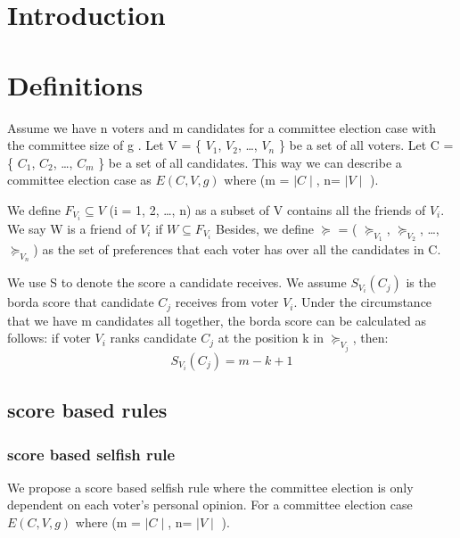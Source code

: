 \documentclass[
   a4paper,                      %
   tucfont,                      %
   english,                      %
   tuctitle,                     %
   intoc,                        %
   twoside,                      %
   captions=tableheading,        %
   openright,                    %
   final,                        %
   ]{tuc-thesis}                 %
\begin{document}
\frontmatter

\makeTUCtitle                   %

\section{Introduction}


\section{Definitions}
Assume we have n voters and m candidates for a committee election case with the committee size of g . Let V = \{ $V_1$, $V_2$, \dots , $V_n$ \} be a set of all voters. Let C = \{ $C_1$, $C_2$, \dots , $C_m$ \} be a set of all candidates. This way we can describe a committee election case as $E(C,V,g)$ where (m = $\mid C \mid$, n= $\mid V \mid$ ).

We define $F_{V_i}  \subseteq V$ (i = 1, 2,  \dots , n) as a subset of V contains all the friends of $V_i$. We say W is a friend of $V_i$ if $W \subseteq F_{V_i}$
\newline
Besides, we define $\succeq$ = ( $\succeq_{V_1}$, $\succeq_{V_2}$, \dots , $\succeq_{V_n}$) as the set of preferences that each voter has over all the candidates in C. 

We use S to denote the score a candidate receives. We assume $S_{V_i}(C_j)$ is the borda score that candidate $C_j$ receives from voter $V_i$. Under the circumstance that we have m candidates all together, the borda score can be calculated as follows: if voter $V_i$ ranks candidate $C_j$ at the position k in $\succeq_{V_j}$, then:
\begin{equation}
S_{V_i}(C_j) =  m - k + 1 \label{con:bordascore}
\end{equation}

\subsection{score based rules}
\subsubsection{score based selfish rule}
We propose a score based selfish rule where the committee election is only dependent on each voter's personal opinion. For a committee election case  $E(C,V,g)$ where (m = $\mid C \mid$, n= $\mid V \mid$ ).
\end{document}
